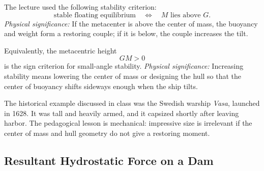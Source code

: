 \documentclass[../main.tex]{subfiles}
\begin{document}
The lecture used the following stability criterion:
\begin{equation}
  \boxed{\text{stable floating equilibrium} \quad \Longleftrightarrow \quad M \text{ lies above } G.}
  \label{eq:lec11_metacenter_criterion}
\end{equation}
\textit{Physical significance:} If the metacenter is above the center of mass, the buoyancy and weight form a restoring couple; if it is below, the couple increases the tilt.

\begin{center}
\end{center}

Equivalently, the metacentric height
\begin{equation}
  \boxed{GM>0}
  \label{eq:lec11_metacentric_height}
\end{equation}
is the sign criterion for small-angle stability.
\textit{Physical significance:} Increasing stability means lowering the center of mass or designing the hull so that the center of buoyancy shifts sideways enough when the ship tilts.

The historical example discussed in class was the Swedish warship \textit{Vasa}, launched in 1628. It was tall and heavily armed, and it capsized shortly after leaving harbor. The pedagogical lesson is mechanical: impressive size is irrelevant if the center of mass and hull geometry do not give a restoring moment.

\subsection{Resultant Hydrostatic Force on a Dam}\label{sec:lec11:dam-force}
\end{document}
